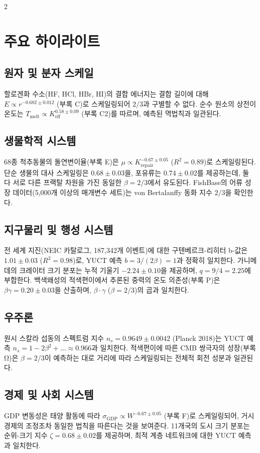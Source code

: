 \documentclass[11pt,a4paper]{article}
\newcommand{\betaf}{\beta}
\begin{document}
\begin{multicols}{2}
		\section{주요 하이라이트}
		
		\subsection{원자 및 분자 스케일}
		할로겐화 수소(HF, HCl, HBr, HI)의 결합 에너지는 결합 길이에 대해 \(E \propto r^{-0.682\pm0.012}\) (부록 C)로 스케일링되어 \(2/3\)과 구별할 수 없다. 순수 원소의 상전이 온도는 \(T_{\text{melt}} \propto K_{\mathrm{eff}}^{0.58\pm0.09}\) (부록 C2)를 따르며, 예측된 멱법칙과 일관된다.
		
		\subsection{생물학적 시스템}
		68종 척추동물의 돌연변이율(부록 E)은 \(\mu \propto K_{\mathrm{repair}}^{-0.67\pm0.05}\) (\(R^2=0.89\))로 스케일링된다. 단순 생물의 대사 스케일링은 \(0.68\pm0.03\)을, 포유류는 \(0.74\pm0.02\)를 제공하는데, 둘 다 서로 다른 프랙탈 차원을 가진 동일한 \(\betaf = 2/3\)에서 유도된다. FishBase의 어류 성장 데이터(5,000개 이상의 매개변수 세트)는 von Bertalanffy 동화 지수 \(2/3\)을 확인한다.
		
		\subsection{지구물리 및 행성 시스템}
		전 세계 지진(NEIC 카탈로그, 187,342개 이벤트)에 대한 구텐베르크-리히터 b-값은 \(1.01\pm0.03\) (\(R^2=0.98\))로, YUCT 예측 \(b = 3/(2\betaf) = 1\)과 정확히 일치한다. 가니메데의 크레이터 크기 분포는 누적 기울기 \(-2.24\pm0.10\)을 제공하며, \(q = 9/4 = 2.25\)에 부합한다. 백색왜성의 적색편이에서 추론된 중력의 온도 의존성(부록 P)은 \(\beta\gamma = 0.20 \pm 0.03\)을 산출하며, \(\betaf \cdot \gamma\) (\(\betaf = 2/3\))의 곱과 일치한다.
		
		\subsection{우주론}
		원시 스칼라 섭동의 스펙트럼 지수 \(n_s = 0.9649\pm0.0042\) (Planck 2018)는 YUCT 예측 \(n_s = 1 - 2\betaf^2 + \dots \approx 0.966\)과 일치한다. 적색편이에 따른 CMB 쌍극자의 성장(부록 Ω)은 \(\betaf = 2/3\)이 예측하는 대로 거리에 따라 스케일링되는 전체적 회전 성분과 일관된다.
		
		\subsection{경제 및 사회 시스템}
		GDP 변동성은 태양 활동에 따라 \(\sigma_{\text{GDP}} \propto W^{-0.67\pm0.05}\) (부록 F)로 스케일링되어, 거시경제의 조정조차 동일한 법칙을 따른다는 것을 보여준다. 11개국의 도시 크기 분포는 순위-크기 지수 \(\zeta = 0.68\pm0.02\)를 제공하며, 최적 계층 네트워크에 대한 YUCT 예측과 일치한다.
		

\end{multicols}
\end{document}
